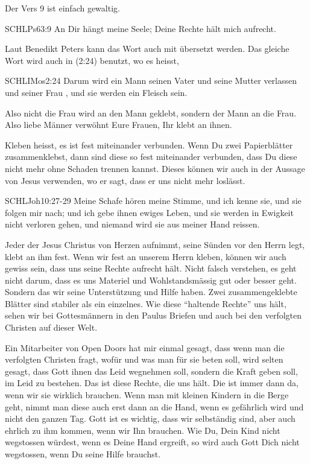 \documentclass[14pt]{../../inc/mybib}
\begin{document}
    \begin{block}
        Der Vers 9 ist einfach gewaltig.
        \begin{bibelbox}{SCHL}{Ps}{63:9}
            An Dir hängt meine Seele; Deine Rechte hält mich aufrecht.
        \end{bibelbox}
        Laut Benedikt Peters kann das Wort  auch mit  übersetzt werden. Das gleiche Wort wird auch in (2:24) benutzt, wo es heisst, 
        \begin{bibelbox}{SCHL}{IMos}{2:24}
            Darum wird ein Mann seinen Vater und seine Mutter verlassen und seiner Frau , und sie werden ein Fleisch sein.
        \end{bibelbox}
        Also nicht die Frau wird an den Mann geklebt, sondern der Mann an die Frau. Also liebe Männer verwöhnt Eure Frauen, Ihr klebt an ihnen.

        Kleben heisst, es ist fest miteinander verbunden. Wenn Du zwei Papierblätter zusammenklebst, dann sind diese so fest miteinander verbunden, dass Du diese nicht mehr ohne Schaden trennen kannst. Dieses  können wir auch in der Aussage von Jesus verwenden, wo er sagt, dass er uns nicht mehr loslässt. 
        \begin{bibelbox}{SCHL}{Joh}{10:27-29}
            Meine Schafe hören meine Stimme, und ich kenne sie, und sie folgen mir nach; und ich gebe ihnen ewiges Leben, und sie werden in Ewigkeit nicht verloren gehen, und niemand wird sie aus meiner Hand reissen.
        \end{bibelbox}
        Jeder der Jesus Christus von Herzen aufnimmt, seine Sünden vor den Herrn legt, klebt an ihm fest. Wenn wir fest an unserem Herrn kleben, können wir auch gewiss sein, dass uns seine Rechte aufrecht hält. Nicht falsch verstehen, es geht nicht darum, dass es uns Materiel und Wohlstandsmässig gut oder besser geht. Sondern das wir seine Unterstützung und Hilfe haben. Zwei zusammengeklebte Blätter sind stabiler als ein einzelnes. Wie diese \enquote{haltende Rechte} uns hält, sehen wir bei Gottesmännern in den Paulus Briefen und auch bei den verfolgten Christen auf dieser Welt. 
        
        Ein Mitarbeiter von Open Doors hat mir einmal gesagt, dass wenn man die verfolgten Christen fragt, wofür und was man für sie beten soll, wird selten gesagt, dass Gott ihnen das Leid wegnehmen soll, sondern die Kraft geben soll, im Leid zu bestehen. Das ist diese Rechte, die uns hält. Die ist immer dann da, wenn wir sie wirklich brauchen. Wenn man mit kleinen Kindern in die Berge geht, nimmt man diese auch erst dann an die Hand, wenn es gefährlich wird und nicht den ganzen Tag. Gott ist es wichtig, dass wir selbständig sind, aber auch ehrlich zu ihm kommen, wenn wir Ihn brauchen. Wie Du, Dein Kind nicht wegstossen würdest, wenn es Deine Hand ergreift, so wird auch Gott Dich nicht wegstossen, wenn Du seine Hilfe brauchst.
    \end{block}
\end{document}
